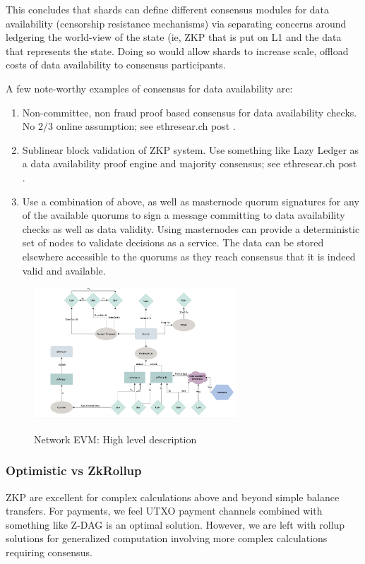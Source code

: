 \documentclass[peerreview]{ieeesyscoin}
\begin{document}
This concludes that shards can define different consensus modules for data availability (censorship resistance mechanisms) via separating concerns around ledgering the world-view of the state (ie, ZKP that is put on L1 and the data that represents the state. Doing so would allow shards to increase scale, offload costs of data availability to consensus participants.

A few note-worthy examples of consensus for data availability are:

\begin{enumerate}
\item Non-committee, non fraud proof based consensus for data availability checks. No $2/3$ online assumption; see ethresear.ch post \cite{But20}. 
\item Sublinear block validation of ZKP system. Use something like Lazy Ledger as a data availability proof engine and majority consensus; see ethresear.ch post \cite{Al20}. 
\item Use a combination of above, as well as masternode quorum signatures for any of the available quorums to sign a message committing to data availability checks as well as data validity. Using masternodes can provide a deterministic set of nodes to validate decisions as a service. The data can be stored elsewhere accessible to the quorums as they reach consensus that it is indeed valid and available.
\end{enumerate}


\begin{figure}[h!]
\includegraphics[width=3in]{img/nevm.png}
\label{fig:nevm}
\caption{Network EVM: High level description} 
\end{figure} 

\subsubsection{Optimistic vs ZkRollup}

ZKP are excellent for complex calculations above and beyond simple balance transfers. For payments, we feel UTXO payment channels combined with something like Z-DAG is an optimal solution. However, we are left with rollup solutions for generalized computation involving more complex calculations requiring consensus.
\end{document}
